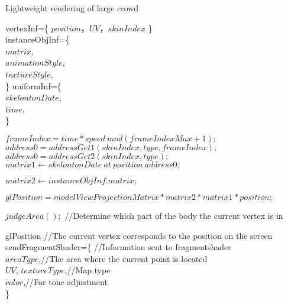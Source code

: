 \documentclass[11pt]{ctexart}
\begin{document}
  
	\begin{algorithm}  
		\caption{Lightweight rendering of large crowd}  
		\begin{algorithmic}[1]  %
			
			\Require 	
			\State
			vertexInf=\{ $position$，$UV$，$skinIndex$   \}\\
			instanceObjInf=\{  \\
				\qquad $matrix$,\\
				\qquad $animationStyle$,\\
				\qquad $textureStyle$,\\
			\}
			\State
			uniformInf=\{  \\
			\qquad $skelontonDate$,\\
			\qquad $time$,\\
			\}
			
			 \State   
			
			  
			  
			  
			  
			  \State $frameIndex=time*speed \ mod (frameIndexMax+1);$
			  \State $address0=addressGet1(skinIndex,type,frameIndex);$
			  \Else  
			  \State $address0=addressGet2(skinIndex,type);$
			  \EndIf   
		\State $matrix1 \gets skelontonDate \ at \ position \ address0 ;$
			  
			  \State  $matrix2 \gets instanceObjInf.matrix;$ 
			  
			  \State  $glPosition = modelViewProjectionMatrix*matrix2*matrix1*position;$
			  
			\State $judgeArea();$ //Determine which part of the body the current vertex is in

			  
			
			\Ensure
			\State
			glPosition //The current vertex corresponds to the position on the screen \\
			sendFragmentShader=\{  //Information sent to fragmentshader\\
			\qquad $areaType$,//The area where the current point is located\\
			\qquad $UV$,
			\qquad $textureType$,//Map type\\
			\qquad $color$,//For tone adjustment\\
			\}
			
		\end{algorithmic}  
	\end{algorithm}  
\end{document}
